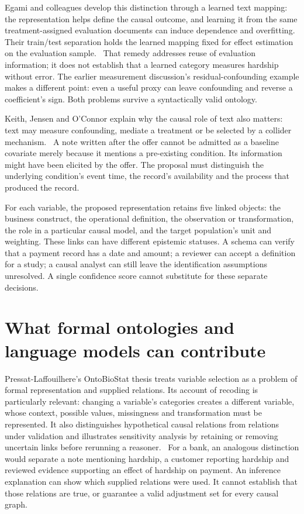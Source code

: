 Egami and colleagues develop this distinction through a learned text mapping:
the representation helps define the causal outcome, and learning it from the
same treatment-assigned evaluation documents can induce dependence and
overfitting. Their train/test separation holds the learned mapping fixed for
effect estimation on the evaluation sample.~\citep{exec13_census_texts}
That remedy addresses reuse of evaluation information; it does not establish
that a learned category measures hardship without error. The earlier
measurement discussion's residual-confounding example makes a different
point: even a useful proxy can leave confounding and reverse a coefficient's
sign. Both problems survive a syntactically valid ontology.

Keith, Jensen and O'Connor explain why the causal role of text also matters:
text may measure confounding, mediate a treatment or be selected by a collider
mechanism.~\citep{exec13_census_text_review_arxiv} A note written after the offer
cannot be admitted as a baseline covariate merely because it mentions a
pre-existing condition. Its information might have been elicited by the offer.
The proposal must distinguish the underlying condition's event time, the
record's availability and the process that produced the record.

For each variable, the proposed representation retains five linked objects:
the business construct, the operational definition, the observation or
transformation, the role in a particular causal model, and the target
population's unit and weighting. These links can have different epistemic
statuses. A schema can verify that a payment record has a date and amount;
a reviewer can accept a definition for a study; a causal analyst can still
leave the identification assumptions unresolved. A single confidence score
cannot substitute for these separate decisions.

\section{What formal ontologies and language models can contribute}

Pressat-Laffouilhere's OntoBioStat thesis treats variable selection as a problem
of formal representation and supplied relations. Its account of recoding is
particularly relevant: changing a variable's categories creates a different
variable, whose context, possible values, missingness and transformation must
be represented. It also distinguishes hypothetical causal relations from
relations under validation and illustrates sensitivity analysis by retaining
or removing uncertain links before rerunning a reasoner.~\citep{exec17_ontology_thesis}
For a bank, an analogous distinction would separate a note mentioning
hardship, a customer reporting hardship and reviewed evidence supporting an
effect of hardship on payment. An inference explanation can show which
supplied relations were used. It cannot establish that those relations are
true, or guarantee a valid adjustment set for every causal graph.

